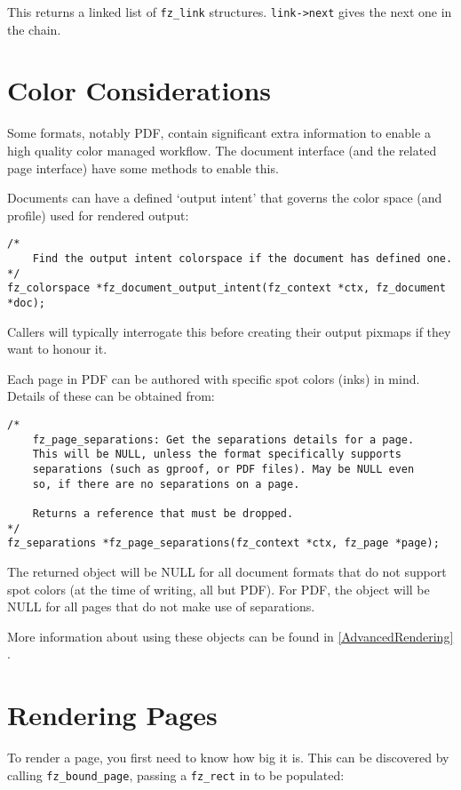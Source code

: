 \documentclass[oneside]{book}
\newcommand{\rjwref}[1] {\autoref{#1} \nameref{#1}}
\begin{document}
This returns a linked list of \texttt{fz\_link} structures. \texttt{link->next} gives the next one in the chain.

\section{Color Considerations}

Some formats, notably PDF, contain significant extra information to enable a high quality color managed workflow. The document interface (and the related page interface) have some methods to enable this.

Documents can have a defined `output intent' that governs the color space (and profile) used for rendered output:

\begin{lstlisting}
/*
	Find the output intent colorspace if the document has defined one.
*/
fz_colorspace *fz_document_output_intent(fz_context *ctx, fz_document *doc);
\end{lstlisting}

Callers will typically interrogate this before creating their output pixmaps if they want to honour it.

Each page in PDF can be authored with specific spot colors (inks) in mind. Details of these can be obtained from:

\begin{lstlisting}
/*
	fz_page_separations: Get the separations details for a page.
	This will be NULL, unless the format specifically supports
	separations (such as gproof, or PDF files). May be NULL even
	so, if there are no separations on a page.

	Returns a reference that must be dropped.
*/
fz_separations *fz_page_separations(fz_context *ctx, fz_page *page);
\end{lstlisting}

The returned object will be NULL for all document formats that do not support spot colors (at the time of writing, all but PDF). For PDF, the object will be NULL for all pages that do not make use of separations.

More information about using these objects can be found in \rjwref{AdvancedRendering}.

\section{Rendering Pages}
\label{RenderingPages}

To render a page, you first need to know how big it is. This can be discovered by calling \texttt{fz\_bound\_page}, passing a \texttt{fz\_rect} in to be populated:
\end{document}
